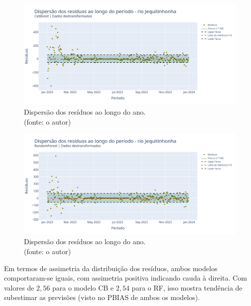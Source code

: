 \begin{figure}[!h]
\centering
\includegraphics[scale=0.33]{Figuras/jequiti/wfv/CB/CB_WFV_LOG_RESID_x_TEMPO.png}
\caption{Dispersão dos resíduos ao longo do ano.\\(fonte: o autor)}
\label{fig:jequiti_CB_WFV_LOG_RESID_x_TEMPO}
\end{figure}

\begin{figure}[!h]
\centering
\includegraphics[scale=0.33]{Figuras/jequiti/wfv/RF/RF_WFV_LOG_RESID_x_TEMPO.png}
\caption{Dispersão dos resíduos ao longo do ano.\\(fonte: o autor)}
\label{fig:jequiti_RF_WFV_LOG_RESID_x_TEMPO}
\end{figure}
\clearpage

Em termos de assimetria da distribuição dos resíduos, ambos modelos comportaram-se iguais, com assimetria positiva indicando cauda à direita. Com valores de $2,56$ para o modelo CB e $2,54$ para o RF, isso mostra tendência de subestimar as previsões (visto no PBIAS de ambos os modelos).

